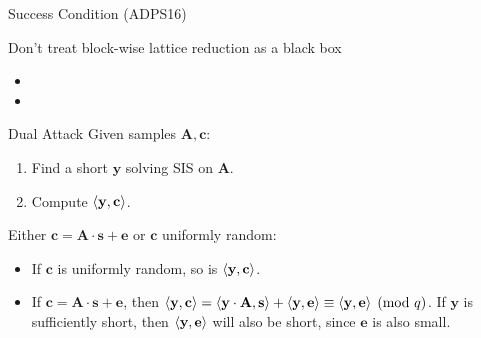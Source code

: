 \documentclass[presentation,smaller]{beamer}
\renewcommand{\vec}[1]{\ensuremath{\mathbf{#1}}\xspace}
\begin{document}
\begin{frame}[label={sec:org3793661}]{Success Condition (ADPS16)}
\end{frame}

\begin{frame}[label={sec:org1fb986d}]{Don’t treat block-wise lattice reduction as a black box}
\begin{itemize}
\item {}

\item {}
\end{itemize}
\end{frame}

\begin{frame}[label={sec:org314c535}]{Dual Attack}
Given samples \(\vec{A}, \vec{c}\):

\begin{enumerate}
\item Find a short \(\vec{y}\) solving SIS on \(\vec{A}\).
\item Compute \(\Angle{\vec{y}, \vec{c}}\).
\end{enumerate}

Either \(\vec{c} = \vec{A}\cdot \vec{s} + \vec{e}\) or \(\vec{c}\) uniformly random:

\begin{itemize}
\item If \(\vec{c}\) is uniformly random, so is \(\Angle{\vec{y}, \vec{c}}\).
\item If \(\vec{c} = \vec{A} \cdot \vec{s} + \vec{e}\), then \(\Angle{\vec{y}, \vec{c}} = \Angle{\vec{y} \cdot \vec{A}, \vec{s}} + \Angle{\vec{y}, \vec{e}} \equiv \Angle{\vec{y}, \vec{e}} \pmod{q}\). If \(\vec{y}\) is sufficiently short, then \(\Angle{\vec{y}, \vec{e}}\) will also be short, since \(\vec{e}\) is also small.
\end{itemize}
\end{frame}
\end{document}
